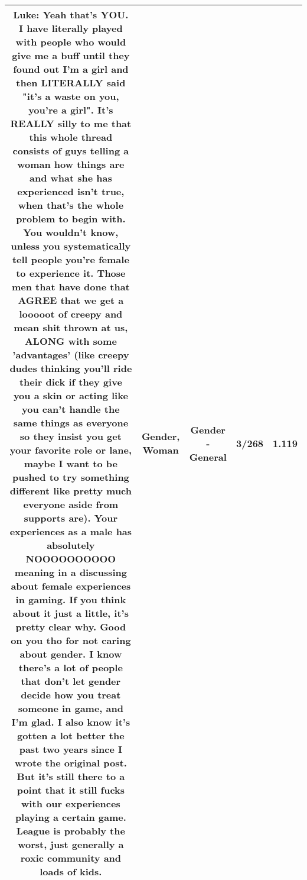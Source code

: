 \documentclass[11pt]{article}
\newlength\mylength
\begin{document}
\begin{center}
\begin{longtable}{|C{.65\mylength}|C{.30\mylength}|C{.12\mylength}|C{.12\mylength}|C{.12\mylength}|}
  \small Luke: Yeah that's YOU. I have literally played with people who would give me a buff until they found out I'm a girl and then LITERALLY said "it's a waste on you, you're a girl". It's REALLY silly to me that this whole thread consists of guys telling a \textbf{woman} how things are and what she has experienced isn't true, when that's the whole problem to begin with. You wouldn't know, unless you systematically tell people you're female to experience it. Those men that have done that AGREE that we get a looooot of creepy and mean shit thrown at us, ALONG with some 'advantages' (like creepy dudes thinking you'll ride their dick if they give you a skin or acting like you can't handle the same things as everyone so they insist you get your favorite role or lane, maybe I want to be pushed to try something different like pretty much everyone aside from supports are). Your experiences as a male has absolutely NOOOOOOOOOO meaning in a discussing about female experiences in gaming. If you think about it just a little, it's pretty clear why. Good on you tho for not caring about \textbf{gender}. I know there's a lot of people that don't let \textbf{gender} decide how you treat someone in game, and I'm glad. I also know it's gotten a lot better the past two years since I wrote the original post. But it's still there to a point that it still fucks with our experiences playing a certain game. League is probably the worst, just generally a roxic community and loads of kids.\normalsize   & Gender, Woman & Gender - General & 3/268 & 1.119 \\  \hline

\end{longtable}
\end{center}
\end{document}
